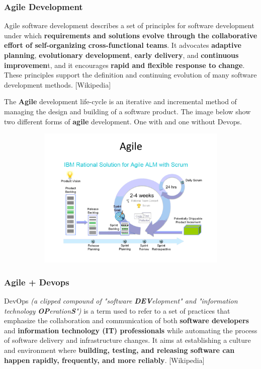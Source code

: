 \documentclass[a4paper]{article}
\begin{document}
\subsubsection{Agile Development}
Agile software development describes a set of principles for software development under which \textbf{requirements and solutions evolve through the collaborative effort of self-organizing cross-functional teams}. It advocates \textbf{adaptive planning}, \textbf{evolutionary development}, \textbf{early delivery}, and \textbf{continuous improvemen}t, and it encourages \textbf{rapid and flexible response to change}. These principles support the definition and continuing evolution of many software development methods. [Wikipedia]

The \textbf{Agile} development life-cycle is an iterative and incremental method of managing the design and building of a software product. The image below show two different forms of \textbf{agile} development. One with and one without Devops.
\begin{figure}[H]
\hskip-2.5cm\begin{subfigure}{1.2\textwidth}
  \includegraphics[width=1.2\linewidth]
  {images/3-Agile.png}
\end{subfigure}
\end{figure}
\subsubsection{Agile + Devops}
DevOps \textit{(a clipped compound of "software \textbf{DEV}elopment" and "information technology \textbf{OP}eration\textbf{S}")} is a term used to refer to a set of practices that emphasize the collaboration and communication of both \textbf{software developers} and \textbf{information technology (IT) professionals} while automating the process of software delivery and infrastructure changes. It aims at establishing a culture and environment where \textbf{building, testing, and releasing software can happen rapidly, frequently, and more reliably}. [Wikipedia]
\end{document}
